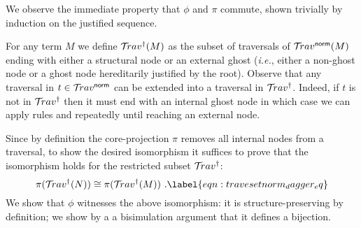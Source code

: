 \documentclass{article}
\makeatletter
\theoremstyle{definition}
\newcommand{\normalizing}{{\sf norm}}
\newcommand{\travsetnorm}{\travset^\normalizing}
\def\coresymbol{\pi} %
\renewcommand\ie{{\it i.e.\@\xspace}}
\makeatother
\begin{document}
We observe the immediate property that $\phi$ and $\coresymbol$ commute, shown trivially by induction on the justified sequence.


For any term $M$ we define $\mathcal{T}\!rav^\dagger(M)$ as the subset of traversals of $\travsetnorm(M)$ ending with either a structural node or an external ghost (\ie, either a non-ghost node or a ghost node hereditarily justified by the root). Observe that any traversal in $t\in\travsetnorm$ can be extended into a traversal in $\mathcal{T}\!rav^\dagger$. Indeed, if $t$ is not in
$\mathcal{T}\!rav^\dagger$ then it must end with an internal ghost node in which case we can apply rules  and  repeatedly until reaching an external node.

Since by definition the core-projection $\coresymbol$ removes all internal nodes from a traversal, to show the desired isomorphism it suffices to prove that the isomorphism holds for the restricted subset $\mathcal{T}\!rav^\dagger$:
\begin{equation}
\coresymbol(\travset^\dagger(N)) \cong \coresymbol(\travset^\dagger(M))
\ .\label{eqn:travesetnorm_dagger_eq}
\end{equation}
We show that $\phi$ witnesses the above isomorphism: it is structure-preserving by definition; we show by a a bisimulation argument that it defines a bijection.
\end{document}
